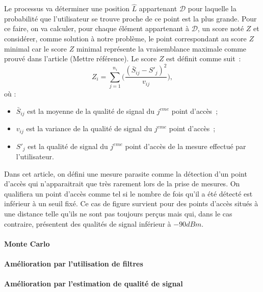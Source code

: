 \documentclass[10pt,journal,compsoc]{IEEEtran}
\begin{document}
        Le processus va déterminer une position $\hat{L}$ appartenant $\mathcal{D}$ pour laquelle la probabilité que l'utilisateur se trouve proche de ce point est la plus grande.
		Pour ce faire, on va calculer, pour chaque élément appartenant à $\mathcal{D}$, un score noté $Z$ et considérer, comme solution à notre problème, le point correspondant
		au score $Z$ minimal car le score $Z$ minimal représente la vraisemblance maximale comme prouvé dans l'article (Mettre référence). Le score $Z$ est définit comme suit~:
        \begin{equation}
          Z_{i} = \sum\limits_{j = 1}^{n_{i}}\bigg(\frac{(\bar{S}_{ij}-S'_{j})^{2}}{v_{ij}}\bigg),
        \end{equation}
        où :
        \begin{itemize}
          \item $\bar{S}_{ij}$ est la moyenne de la qualité de signal du $j^{eme}$ point d'accès~;
          \item $v_{ij}$ est la variance de la qualité de signal du $j^{eme}$ point d'accès~;
          \item $S'_{j}$ est la qualité de signal du $j^{eme}$ point d'accès de la mesure effectué par l'utilisateur.
        \end{itemize}

        \begin{tcolorbox}[title = Mesures parasites]
          Dans cet article, on défini une mesure parasite comme la détection d'un point d'accès qui n'apparaitrait que très rarement lors de la prise de mesures. On qualifiera
		  un point d'accès comme tel si le nombre de fois qu'il a été détecté est inférieur à un seuil fixé.
          Ce cas de figure survient pour des points d'accès situés à une distance telle qu'ils ne sont pas toujours perçus mais qui, dans le cas contraire, présentent des qualités
		  de signal inférieur à $-90 dBm$.
        \end{tcolorbox}

      \paragraph{Monte Carlo}
      \paragraph{Amélioration par l'utilisation de filtres}
      \paragraph{Amélioration par l'estimation de qualité de signal}
\end{document}

